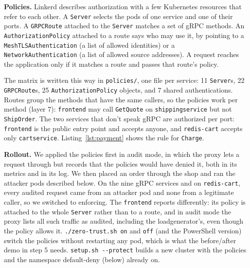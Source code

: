\documentclass[12pt,a4paper]{article}
\begin{document}
\textbf{Policies.} Linkerd describes authorization with a few Kubernetes
resources that refer to each other. A \texttt{Server} selects the pods of one
service and one of their ports. A \texttt{GRPCRoute} attached to the
\texttt{Server} matches a set of gRPC methods. An
\texttt{AuthorizationPolicy} attached to a route says who may use it, by
pointing to a \texttt{MeshTLSAuthentication} (a list of allowed identities)
or a \texttt{NetworkAuthentication} (a list of allowed source addresses).
A request reaches the application only if it matches a route and passes that
route's policy.

The matrix is written this way in \texttt{policies/}, one file per service:
11 \texttt{Server}s, 22 \texttt{GRPCRoute}s, 25 \texttt{AuthorizationPolicy}
objects, and 7 shared authentications. Routes group the methods that have the
same callers, so the policies work per method (layer 7): \texttt{frontend}
may call \texttt{GetQuote} on \texttt{shippingservice} but not
\texttt{ShipOrder}. The two services that don't speak gRPC are authorized per
port: \texttt{frontend} is the public entry point and accepts anyone, and
\texttt{redis-cart} accepts only \texttt{cartservice}.
Listing~\ref{lst:payment} shows the rule for \texttt{Charge}.


\textbf{Rollout.} We applied the policies first in audit mode, in which the
proxy lets a request through but records that the policies would have denied
it, both in its metrics and in its log. We then placed an order through the
shop and ran the attacker pods described below. On the nine gRPC services
and on \texttt{redis-cart}, every audited request came from an attacker pod
and none from a legitimate caller, so we switched to enforcing. The
\texttt{frontend} reports
differently: its policy is attached to the whole \texttt{Server} rather than
to a route, and in audit mode the proxy lists all such traffic as audited,
including the loadgenerator's, even though the policy allows it. \texttt{./zero-trust.sh on} and \texttt{off} (and the PowerShell
version) switch the policies without restarting any pod, which is what the
before/after demo in step 5 needs. \texttt{setup.sh -{}-protect} builds a new
cluster with the policies and the namespace default-deny (below) already on.
\end{document}
